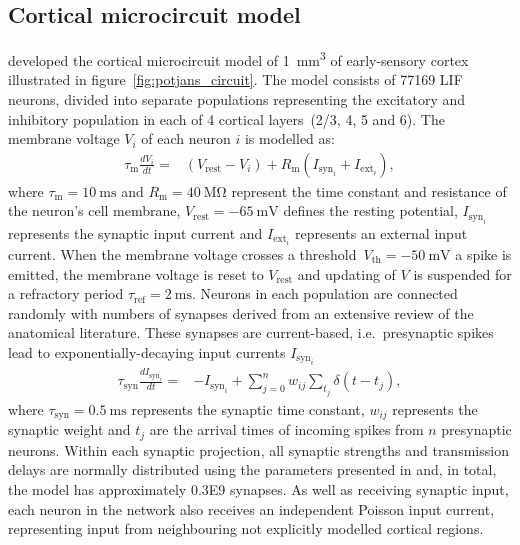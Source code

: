 \documentclass[utf8]{frontiersSCNS} %
\begin{document}
\subsection{Cortical microcircuit model}
\label{sec:methods/cortical_microcircuit}
\citet{Potjans2012} developed the cortical microcircuit model of \SI{1}{\milli\metre\cubed} of early-sensory cortex illustrated in figure~\ref{fig:potjans_circuit}.
The model consists of \num{77169} LIF neurons, divided into separate populations representing the excitatory and inhibitory population in each of 4 cortical layers~(2/3, 4, 5 and 6).
The membrane voltage $V_{i}$ of each neuron $i$ is modelled as:
%
\begin{align}
    \tau_{\text{m}} \frac{dV_{i}}{dt} = & (V_{\text{rest}} - V_{i}) + R_{\text{m}}(I_{\text{syn}_{i}} + I_{\text{ext}_{i}}), \label{eq:lif_neuron}
\end{align}
%
where $\tau_{\text{m}} = \SI{10}{\milli\second}$ and $R_{\text{m}} = \SI{40}{\mega\ohm}$ represent the time constant and resistance of the neuron's cell membrane, $V_{\text{rest}} = \SI{-65}{\milli\volt}$ defines the resting potential, $I_{\text{syn}_{i}}$ represents the synaptic input current and $I_{\text{ext}_i}$ represents an external input current.
When the membrane voltage crosses a threshold~$V_{\text{th}} = \SI{-50}{\milli\volt}$ a spike is emitted, the membrane voltage is reset to $V_{\text{rest}}$ and updating of $V$ is suspended for a refractory period $\tau_{\text{ref}} = \SI{2}{\milli\second}$.
Neurons in each population are connected randomly with numbers of synapses derived from an extensive review of the anatomical literature.
These synapses are current-based, i.e.~presynaptic spikes lead to exponentially-decaying input currents $I_{\text{syn}_{i}}$
%
\begin{align}
    \tau_{\text{syn}} \frac{dI_{\text{syn}_{i}}}{dt} = & -I_{\text{syn}_{i}} + \sum_{j=0}^{n} w_{ij} \sum_{t_{j}}  \delta(t - t_{j}),\label{eq:exp_neuron_input_current}
\end{align}
%
where $\tau_{\text{syn}} = \SI{0.5}{\milli\second}$ represents the synaptic time constant, $w_{ij}$ represents the synaptic weight and $t_{j}$ are the arrival times of incoming spikes from $n$ presynaptic neurons.
Within each synaptic projection, all synaptic strengths and transmission delays are normally distributed using the parameters presented in \citet[table 5]{Potjans2012} and, in total, the model has approximately \num{0.3E9} synapses.
As well as receiving synaptic input, each neuron in the network also receives an independent Poisson input current, representing input from neighbouring not explicitly modelled cortical regions.
\end{document}
